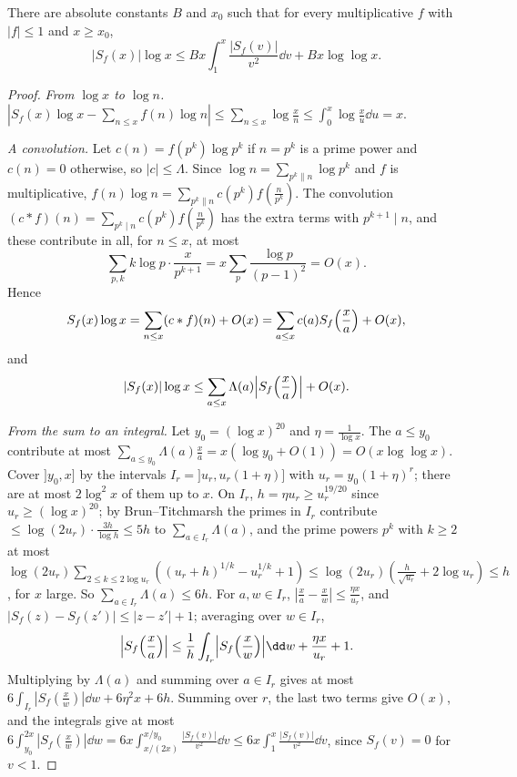 \begin{lemma}\label{lem:halineq}
There are absolute constants $B$ and $x_0$ such that for every multiplicative $f$ with $|f|\le1$ and $x\ge x_0$,
\[
|S_f(x)|\log x\le Bx\int_1^x\frac{|S_f(v)|}{v^2}\dd v+Bx\log\log x.
\]
\end{lemma}
\begin{proof}
\emph{From $\log x$ to $\log n$.} $|S_f(x)\log x-\sum_{n\le x}f(n)\log n|\le\sum_{n\le x}\log\frac xn\le\int_0^x\log\frac xu\dd u=x$.

\emph{A convolution.} Let $c(n)=f(p^k)\log p^k$ if $n=p^k$ is a prime power and $c(n)=0$ otherwise, so $|c|\le\Lambda$. Since $\log n=\sum_{p^k\|n}\log p^k$ and $f$ is multiplicative, $f(n)\log n=\sum_{p^k\|n}c(p^k)f(\frac n{p^k})$. The convolution $(c*f)(n)=\sum_{p^k\mid n}c(p^k)f(\frac n{p^k})$ has the extra terms with $p^{k+1}\mid n$, and these contribute in all, for $n\le x$, at most
\[
\sum_{p,k}k\log p\cdot\frac x{p^{k+1}}=x\sum_p\frac{\log p}{(p-1)^2}=O(x).
\]
Hence
\[
S_f(x)\log x=\sum_{n\le x}(c*f)(n)+O(x)=\sum_{a\le x}c(a)S_f\Bigl(\frac xa\Bigr)+O(x),
\]
and
\[
|S_f(x)|\log x\le\sum_{a\le x}\Lambda(a)\Bigl|S_f\Bigl(\frac xa\Bigr)\Bigr|+O(x).
\]

\emph{From the sum to an integral.} Let $y_0=(\log x)^{20}$ and $\eta=\frac1{\log x}$. The $a\le y_0$ contribute at most $\sum_{a\le y_0}\Lambda(a)\frac xa=x(\log y_0+O(1))=O(x\log\log x)$. Cover $]y_0,x]$ by the intervals $I_r=]u_r,u_r(1+\eta)]$ with $u_r=y_0(1+\eta)^r$; there are at most $2\log^2x$ of them up to $x$. On $I_r$, $h=\eta u_r\ge u_r^{19/20}$ since $u_r\ge(\log x)^{20}$; by Brun--Titchmarsh the primes in $I_r$ contribute $\le\log(2u_r)\cdot\frac{3h}{\log h}\le5h$ to $\sum_{a\in I_r}\Lambda(a)$, and the prime powers $p^k$ with $k\ge2$ at most $\log(2u_r)\sum_{2\le k\le2\log u_r}((u_r+h)^{1/k}-u_r^{1/k}+1)\le\log(2u_r)(\frac h{\sqrt{u_r}}+2\log u_r)\le h$, for $x$ large. So $\sum_{a\in I_r}\Lambda(a)\le6h$. For $a,w\in I_r$, $|\frac xa-\frac xw|\le\frac{\eta x}{u_r}$, and $|S_f(z)-S_f(z')|\le|z-z'|+1$; averaging over $w\in I_r$,
\[
\Bigl|S_f\Bigl(\frac xa\Bigr)\Bigr|\le\frac1h\int_{I_r}\Bigl|S_f\Bigl(\frac xw\Bigr)\Bigr|\dd w+\frac{\eta x}{u_r}+1.
\]
Multiplying by $\Lambda(a)$ and summing over $a\in I_r$ gives at most $6\int_{I_r}|S_f(\frac xw)|\dd w+6\eta^2x+6h$. Summing over $r$, the last two terms give $O(x)$, and the integrals give at most $6\int_{y_0}^{2x}|S_f(\frac xw)|\dd w=6x\int_{x/(2x)}^{x/y_0}\frac{|S_f(v)|}{v^2}\dd v\le6x\int_1^x\frac{|S_f(v)|}{v^2}\dd v$, since $S_f(v)=0$ for $v<1$.
\end{proof}

